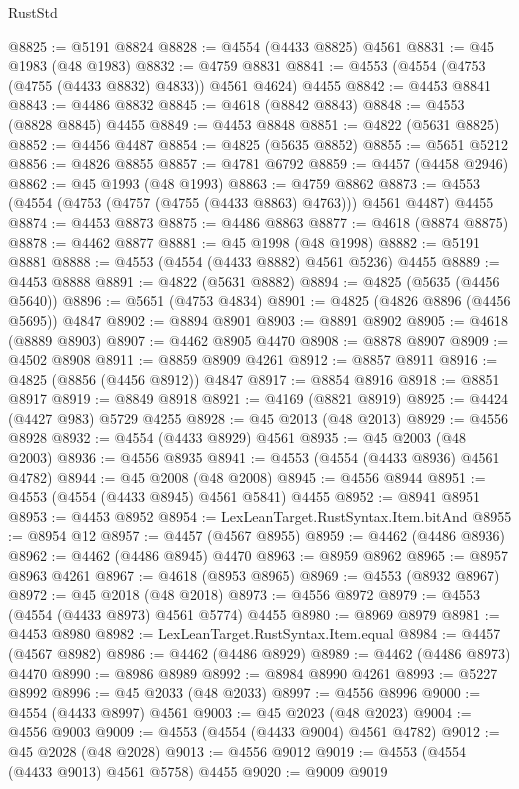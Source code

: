 \begin{lexlean}{RustStd}
\begin{coremodule}
@8825 := @5191 @8824
@8828 := @4554 (@4433 @8825) @4561
@8831 := @45 @1983 (@48 @1983)
@8832 := @4759 @8831
@8841 := @4553 (@4554 (@4753 (@4755 (@4433 @8832) @4833)) @4561 @4624) @4455
@8842 := @4453 @8841
@8843 := @4486 @8832
@8845 := @4618 (@8842 @8843)
@8848 := @4553 (@8828 @8845) @4455
@8849 := @4453 @8848
@8851 := @4822 (@5631 @8825)
@8852 := @4456 @4487
@8854 := @4825 (@5635 @8852)
@8855 := @5651 @5212
@8856 := @4826 @8855
@8857 := @4781 @6792
@8859 := @4457 (@4458 @2946)
@8862 := @45 @1993 (@48 @1993)
@8863 := @4759 @8862
@8873 := @4553 (@4554 (@4753 (@4757 (@4755 (@4433 @8863) @4763))) @4561 @4487) @4455
@8874 := @4453 @8873
@8875 := @4486 @8863
@8877 := @4618 (@8874 @8875)
@8878 := @4462 @8877
@8881 := @45 @1998 (@48 @1998)
@8882 := @5191 @8881
@8888 := @4553 (@4554 (@4433 @8882) @4561 @5236) @4455
@8889 := @4453 @8888
@8891 := @4822 (@5631 @8882)
@8894 := @4825 (@5635 (@4456 @5640))
@8896 := @5651 (@4753 @4834)
@8901 := @4825 (@4826 @8896 (@4456 @5695)) @4847
@8902 := @8894 @8901
@8903 := @8891 @8902
@8905 := @4618 (@8889 @8903)
@8907 := @4462 @8905 @4470
@8908 := @8878 @8907
@8909 := @4502 @8908
@8911 := @8859 @8909 @4261
@8912 := @8857 @8911
@8916 := @4825 (@8856 (@4456 @8912)) @4847
@8917 := @8854 @8916
@8918 := @8851 @8917
@8919 := @8849 @8918
@8921 := @4169 (@8821 @8919)
@8925 := @4424 (@4427 @983) @5729 @4255
@8928 := @45 @2013 (@48 @2013)
@8929 := @4556 @8928
@8932 := @4554 (@4433 @8929) @4561
@8935 := @45 @2003 (@48 @2003)
@8936 := @4556 @8935
@8941 := @4553 (@4554 (@4433 @8936) @4561 @4782)
@8944 := @45 @2008 (@48 @2008)
@8945 := @4556 @8944
@8951 := @4553 (@4554 (@4433 @8945) @4561 @5841) @4455
@8952 := @8941 @8951
@8953 := @4453 @8952
@8954 := LexLeanTarget.RustSyntax.Item.bitAnd
@8955 := @8954 @12
@8957 := @4457 (@4567 @8955)
@8959 := @4462 (@4486 @8936)
@8962 := @4462 (@4486 @8945) @4470
@8963 := @8959 @8962
@8965 := @8957 @8963 @4261
@8967 := @4618 (@8953 @8965)
@8969 := @4553 (@8932 @8967)
@8972 := @45 @2018 (@48 @2018)
@8973 := @4556 @8972
@8979 := @4553 (@4554 (@4433 @8973) @4561 @5774) @4455
@8980 := @8969 @8979
@8981 := @4453 @8980
@8982 := LexLeanTarget.RustSyntax.Item.equal
@8984 := @4457 (@4567 @8982)
@8986 := @4462 (@4486 @8929)
@8989 := @4462 (@4486 @8973) @4470
@8990 := @8986 @8989
@8992 := @8984 @8990 @4261
@8993 := @5227 @8992
@8996 := @45 @2033 (@48 @2033)
@8997 := @4556 @8996
@9000 := @4554 (@4433 @8997) @4561
@9003 := @45 @2023 (@48 @2023)
@9004 := @4556 @9003
@9009 := @4553 (@4554 (@4433 @9004) @4561 @4782)
@9012 := @45 @2028 (@48 @2028)
@9013 := @4556 @9012
@9019 := @4553 (@4554 (@4433 @9013) @4561 @5758) @4455
@9020 := @9009 @9019

\end{coremodule}
\end{lexlean}
